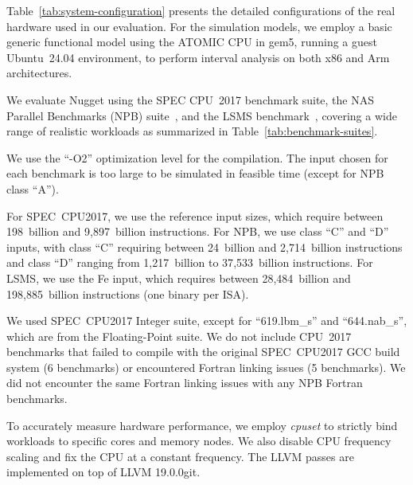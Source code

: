 Table~\ref{tab:system-configuration} presents the detailed configurations of the real hardware used in our evaluation. 
For the simulation models, we employ a basic generic functional model using the ATOMIC CPU in gem5, running a guest Ubuntu~24.04 environment, to perform interval analysis on both x86 and Arm architectures.

We evaluate Nugget using the SPEC CPU~2017 benchmark suite, the NAS Parallel Benchmarks (NPB) suite~\cite{npb}, and the LSMS benchmark~\cite{LSMS}, covering a wide range of realistic workloads as summarized in Table~\ref{tab:benchmark-suites}.

We use the ``-O2'' optimization level for the compilation.
The input chosen for each benchmark is too large to be simulated in feasible time (except for NPB class ``A'').

For SPEC~CPU2017, we use the reference input sizes, which require between 198~billion and 9{,}897~billion instructions.
For NPB, we use class ``C'' and ``D'' inputs, with class ``C'' requiring between 24~billion and 2{,}714~billion instructions and class ``D'' ranging from 1{,}217~billion to 37{,}533~billion instructions. 
For LSMS, we use the Fe input, which requires between 28{,}484~billion and 198{,}885~billion instructions (one binary per ISA).


We used SPEC~CPU2017 Integer suite, except for ``619.lbm\_s'' and ``644.nab\_s'', which are from the Floating-Point suite.
We do not include CPU~2017 benchmarks that failed to compile with the original SPEC~CPU2017 GCC build system (6 benchmarks) or encountered Fortran linking issues (5 benchmarks).
  We did not encounter the same Fortran linking issues with any NPB Fortran benchmarks.

To accurately measure hardware performance, we employ \textit{cpuset} to strictly bind workloads to specific cores and memory nodes. 
We also disable CPU frequency scaling and fix the CPU at a constant frequency. 
The LLVM passes are implemented on top of LLVM 19.0.0git.

